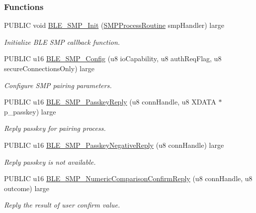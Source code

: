 \subsubsection*{Functions}
\begin{DoxyCompactItemize}
\item 
P\+U\+B\+L\+IC void \hyperlink{group___b_l_e___s_m_p_gae7bb1bfd0a4eeac1531129cc367938f8}{B\+L\+E\+\_\+\+S\+M\+P\+\_\+\+Init} (\hyperlink{group___b_l_e___s_m_p_ga7f30c62e9c95a30117c43022a3153756}{S\+M\+P\+Process\+Routine} smp\+Handler) large
\begin{DoxyCompactList}\small\item\em Initialize B\+LE S\+MP callback function. \end{DoxyCompactList}\item 
P\+U\+B\+L\+IC u16 \hyperlink{group___b_l_e___s_m_p_gab8d154c9bf2e4a4a1b0493e928492f5d}{B\+L\+E\+\_\+\+S\+M\+P\+\_\+\+Config} (u8 io\+Capability, u8 auth\+Req\+Flag, u8 secure\+Connections\+Only) large
\begin{DoxyCompactList}\small\item\em Configure S\+MP pairing parameters. \end{DoxyCompactList}\item 
P\+U\+B\+L\+IC u16 \hyperlink{group___b_l_e___s_m_p_gaf6a9091e86450424cac916e91ab5c80e}{B\+L\+E\+\_\+\+S\+M\+P\+\_\+\+Passkey\+Reply} (u8 conn\+Handle, u8 X\+D\+A\+TA $\ast$p\+\_\+passkey) large
\begin{DoxyCompactList}\small\item\em Reply passkey for pairing process. \end{DoxyCompactList}\item 
P\+U\+B\+L\+IC u16 \hyperlink{group___b_l_e___s_m_p_ga1095799e8d8600baca772031fafc10d5}{B\+L\+E\+\_\+\+S\+M\+P\+\_\+\+Passkey\+Negative\+Reply} (u8 conn\+Handle) large
\begin{DoxyCompactList}\small\item\em Reply passkey is not available. \end{DoxyCompactList}\item 
P\+U\+B\+L\+IC u16 \hyperlink{group___b_l_e___s_m_p_ga34db5e801070618d3971896cc60bafb2}{B\+L\+E\+\_\+\+S\+M\+P\+\_\+\+Numeric\+Comparison\+Confirm\+Reply} (u8 conn\+Handle, u8 outcome) large
\begin{DoxyCompactList}\small\item\em Reply the result of user confirm value. \end{DoxyCompactList}\item 

\end{DoxyCompactItemize}
